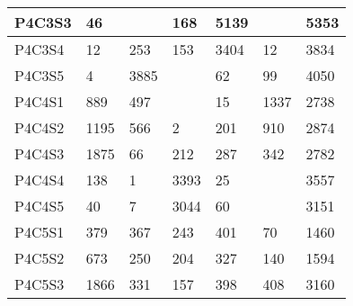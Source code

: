\begin{longtable}{lllllll}
\multicolumn{1}{|l|}{P4C3S3} & \multicolumn{1}{l|}{46} & \multicolumn{1}{l|}{} & \multicolumn{1}{l|}{168} & \multicolumn{1}{l|}{5139} & \multicolumn{1}{l|}{} & \multicolumn{1}{l|}{5353} \\ \hline
\multicolumn{1}{|l|}{P4C3S4} & \multicolumn{1}{l|}{12} & \multicolumn{1}{l|}{253} & \multicolumn{1}{l|}{153} & \multicolumn{1}{l|}{3404} & \multicolumn{1}{l|}{12} & \multicolumn{1}{l|}{3834} \\ \hline
\multicolumn{1}{|l|}{P4C3S5} & \multicolumn{1}{l|}{4} & \multicolumn{1}{l|}{3885} & \multicolumn{1}{l|}{} & \multicolumn{1}{l|}{62} & \multicolumn{1}{l|}{99} & \multicolumn{1}{l|}{4050} \\ \hline
\multicolumn{1}{|l|}{P4C4S1} & \multicolumn{1}{l|}{889} & \multicolumn{1}{l|}{497} & \multicolumn{1}{l|}{} & \multicolumn{1}{l|}{15} & \multicolumn{1}{l|}{1337} & \multicolumn{1}{l|}{2738} \\ \hline
\multicolumn{1}{|l|}{P4C4S2} & \multicolumn{1}{l|}{1195} & \multicolumn{1}{l|}{566} & \multicolumn{1}{l|}{2} & \multicolumn{1}{l|}{201} & \multicolumn{1}{l|}{910} & \multicolumn{1}{l|}{2874} \\ \hline
\multicolumn{1}{|l|}{P4C4S3} & \multicolumn{1}{l|}{1875} & \multicolumn{1}{l|}{66} & \multicolumn{1}{l|}{212} & \multicolumn{1}{l|}{287} & \multicolumn{1}{l|}{342} & \multicolumn{1}{l|}{2782} \\ \hline
\multicolumn{1}{|l|}{P4C4S4} & \multicolumn{1}{l|}{138} & \multicolumn{1}{l|}{1} & \multicolumn{1}{l|}{3393} & \multicolumn{1}{l|}{25} & \multicolumn{1}{l|}{} & \multicolumn{1}{l|}{3557} \\ \hline
\multicolumn{1}{|l|}{P4C4S5} & \multicolumn{1}{l|}{40} & \multicolumn{1}{l|}{7} & \multicolumn{1}{l|}{3044} & \multicolumn{1}{l|}{60} & \multicolumn{1}{l|}{} & \multicolumn{1}{l|}{3151} \\ \hline
\multicolumn{1}{|l|}{P4C5S1} & \multicolumn{1}{l|}{379} & \multicolumn{1}{l|}{367} & \multicolumn{1}{l|}{243} & \multicolumn{1}{l|}{401} & \multicolumn{1}{l|}{70} & \multicolumn{1}{l|}{1460} \\ \hline
\multicolumn{1}{|l|}{P4C5S2} & \multicolumn{1}{l|}{673} & \multicolumn{1}{l|}{250} & \multicolumn{1}{l|}{204} & \multicolumn{1}{l|}{327} & \multicolumn{1}{l|}{140} & \multicolumn{1}{l|}{1594} \\ \hline
\multicolumn{1}{|l|}{P4C5S3} & \multicolumn{1}{l|}{1866} & \multicolumn{1}{l|}{331} & \multicolumn{1}{l|}{157} & \multicolumn{1}{l|}{398} & \multicolumn{1}{l|}{408} & \multicolumn{1}{l|}{3160} \\ \hline

\end{longtable}
